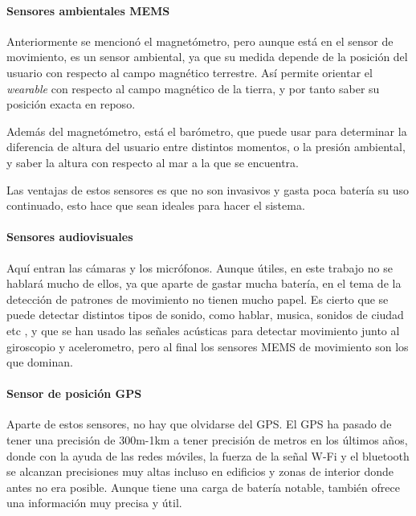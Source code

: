 \documentclass[12pt]{article}
\numberwithin{equation}{section}
\begin{document}
{\paragraph{Sensores ambientales MEMS}

Anteriormente se mencionó el magnetómetro, pero aunque está en el sensor de movimiento, es un sensor ambiental, ya que su medida depende de la posición del usuario con respecto al campo magnético terrestre. Así permite orientar el \textit{wearable} con respecto al campo magnético de la tierra, y por tanto saber su posición exacta en reposo.

Además del magnetómetro, está el barómetro, que puede usar para determinar la diferencia de altura del usuario entre distintos momentos, o la presión ambiental, y saber la altura con respecto al mar a la que se encuentra.

Las ventajas de estos sensores es que no son invasivos y gasta poca batería su uso continuado, esto hace que sean ideales para hacer el sistema.
\paragraph{Sensores audiovisuales}

Aquí entran las cámaras y los micrófonos. Aunque útiles, en este trabajo no se hablará mucho de ellos, ya que aparte de gastar mucha batería, en el tema de la detección de patrones de movimiento no tienen mucho papel. Es cierto que se puede detectar distintos tipos de sonido, como hablar, musica, sonidos de ciudad etc \cite{Lu:2009:SSS:1555816.1555834}, y que se han usado las señales acústicas para detectar movimiento junto al giroscopio y acelerometro\cite{doi:10.1155/2014/503291}, pero al final los sensores MEMS de movimiento son los que dominan.

\paragraph{Sensor de posición GPS}

Aparte de estos sensores, no hay que olvidarse del GPS. El GPS ha pasado de tener una precisión de 300m-1km\cite{vonWatzdorf:2010:APD:1899662.1899664} a tener precisión de metros en los últimos años\cite{s213}, donde con la ayuda de las redes móviles, la fuerza de la señal W-Fi y el bluetooth se alcanzan precisiones muy altas incluso en edificios y zonas de interior donde antes no era posible. Aunque tiene una carga de batería notable, también ofrece una información muy precisa y útil.

}
\end{document}
